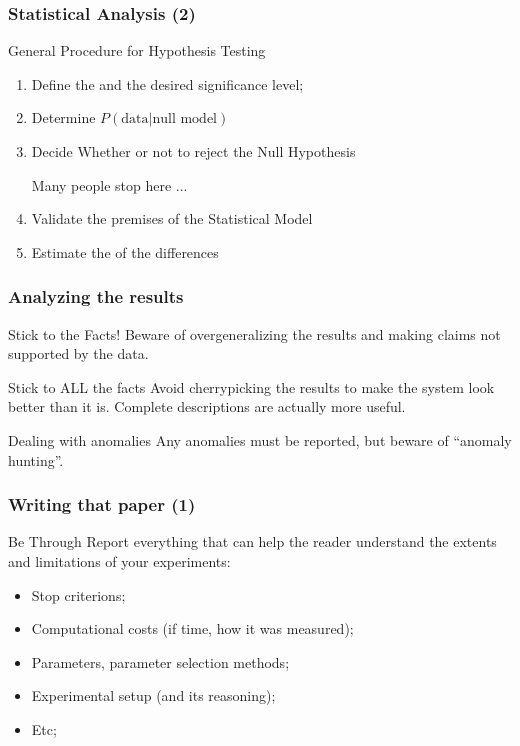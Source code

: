 \documentclass{beamer}
\begin{document}
\begin{frame}
  \frametitle{Statistical Analysis (2)}
  \begin{block}{General Procedure for Hypothesis Testing}
    \begin{enumerate}
      \item<1-> Define the  and the desired
        significance level;
      \item<2-> Determine $P(\text{data}|\text{null model})$
      \item<3-> Decide Whether or not to reject the Null Hypothesis
        
        \bigskip

         {\small Many people stop here ...}

      \item <5-> Validate the premises of the Statistical Model
      \item <6-> Estimate the  of the differences
    \end{enumerate}
  \end{block}
\end{frame}

\begin{frame}
  \frametitle{Analyzing the results}
  \begin{block}{Stick to the Facts!}
    Beware of overgeneralizing the results and making claims not
    supported by the data.
  \end{block}

  \begin{block}{Stick to ALL the facts}
    Avoid cherrypicking the results to make the system look better
    than it is. Complete descriptions are actually more useful.
  \end{block}

  \begin{block}{Dealing with anomalies}
    Any anomalies must be reported, but beware of ``anomaly hunting''.
  \end{block}
\end{frame}

\begin{frame}
  \frametitle{Writing that paper (1)}
  \begin{block}{Be Through}
    Report everything that can help the reader understand the extents
    and limitations of your experiments:
    \begin{itemize}
      \item Stop criterions;
      \item Computational costs (if time, how it was measured);
      \item Parameters, parameter selection methods;
      \item Experimental setup (and its reasoning);
      \item Etc;
    \end{itemize}
  \end{block}
\end{frame}
\end{document}
